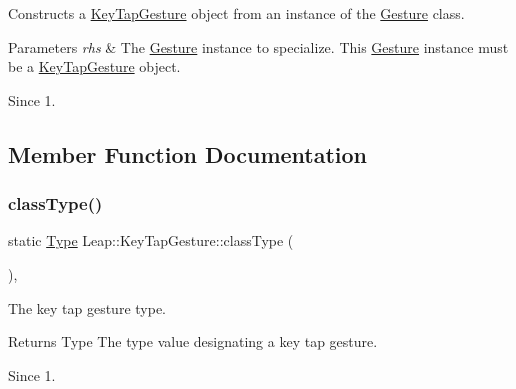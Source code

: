 Constructs a \hyperlink{class_leap_1_1_key_tap_gesture}{Key\+Tap\+Gesture} object from an instance of the \hyperlink{class_leap_1_1_gesture}{Gesture} class.


\begin{DoxyCodeInclude}
\end{DoxyCodeInclude}



\begin{DoxyParams}{Parameters}
{\em rhs} & The \hyperlink{class_leap_1_1_gesture}{Gesture} instance to specialize. This \hyperlink{class_leap_1_1_gesture}{Gesture} instance must be a \hyperlink{class_leap_1_1_key_tap_gesture}{Key\+Tap\+Gesture} object. \\
\hline
\end{DoxyParams}
\begin{DoxySince}{Since}
1. 
\end{DoxySince}


\subsection{Member Function Documentation}
\mbox{\label{class_leap_1_1_key_tap_gesture_a674173890d1f8b1b2d2cee98245b65f2}} 
\subsubsection{\texorpdfstring{class\+Type()}{classType()}}
{\footnotesize\ttfamily static \hyperlink{class_leap_1_1_gesture_a6fa6dd4f28c502f0d55abc6b71c6f9b1}{Type} Leap\+::\+Key\+Tap\+Gesture\+::class\+Type (\begin{DoxyParamCaption}{ }\end{DoxyParamCaption})\hspace{0.3cm}{\ttfamily [inline]}, {\ttfamily [static]}}

The key tap gesture type.


\begin{DoxyCodeInclude}
\end{DoxyCodeInclude}


\begin{DoxyReturn}{Returns}
Type The type value designating a key tap gesture. 
\end{DoxyReturn}
\begin{DoxySince}{Since}
1. 
\end{DoxySince}
\mbox{\label{class_leap_1_1_key_tap_gesture_aa85b81080efc56e05ae35f852ab6794e}} 
